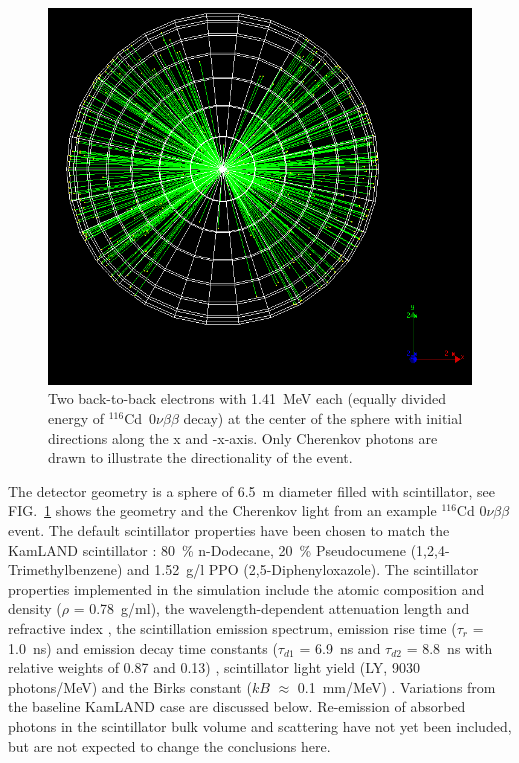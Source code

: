 \documentclass[aps,prc,twocolumn,groupedaddress,showpacs,amsmath,amssymb,floatfix,superscriptaddress]{revtex4}
\begin{document}
\begin{figure}
        \begin{center}
        \includegraphics[scale=0.25]{graphs/detector_view.png}
        \caption[]{Two back-to-back electrons with 1.41~MeV each
        (equally divided energy of $^{116}$Cd~$0\nu\beta\beta$ decay) at
        the center of the sphere with initial directions along the x
        and -x-axis. Only Cherenkov photons are drawn to illustrate the
        directionality of the event. \label{detector_view}}
        \end{center}
\end{figure}

The detector geometry is a sphere of 6.5~m diameter filled with scintillator, see FIG.~\ref{detector_view} shows the geometry and the Cherenkov light from an example $^{116}$Cd $0\nu\beta\beta$ event. The default
scintillator properties have been chosen to match the KamLAND
scintillator \cite{kamland2003}: 80~\% n-Dodecane, 20~\% Pseudocumene
(1,2,4-Trimethylbenzene) and 1.52~g/l PPO (2,5-Diphenyloxazole). The
scintillator properties implemented in the simulation include the
atomic composition and density ($\rho$ = 0.78~g/ml), the
wavelength-dependent attenuation length \cite{tajimaMaster} and
refractive index \cite{OlegThesis}, the scintillation emission
spectrum\cite{tajimaMaster}, emission rise time ($\tau_r$ = 1.0~ns) and emission decay
time constants ($\tau_{d1}$ = 6.9~ns and $\tau_{d2}$ = 8.8~ns with
relative weights of 0.87 and 0.13)
\cite{tajimaThesis}, scintillator light yield (LY, 9030 photons/MeV)
and the Birks constant ($kB$ $\approx$ 0.1~mm/MeV)
\cite{ChrisThesis}. Variations from the baseline KamLAND case are
discussed below. Re-emission of absorbed photons in the scintillator
bulk volume and scattering have not yet been included, but are not
expected to change the conclusions here.
\end{document}
